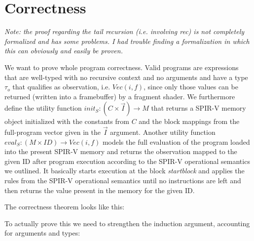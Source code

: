 \documentclass[letterpaper,12pt]{article}
\newcommand{\vi}{\vec{I}}
\begin{document}
\section{Correctness}

\textit{Note: the proof regarding the tail recursion (i.e. involving \textit{rec})
is not completely formalized and has some problems. I had trouble finding a formalization
in which this can obviously and easily be proven.}
\medskip

We want to prove whole program correctness. Valid programs are expressions
that are well-typed with no recursive context and no arguments and
have a type $\tau_o$ that qualifies as observation, i.e. $Vec(i, f)$, since only
those values can be returned (written into a framebuffer) by a fragment shader.
We furthermore define the utility function
$init_S: (C \times \vi) \rightarrow M $ that returns
a SPIR-V memory object initialized with the constants from $C$ and the 
block mappings from the full-program vector given in the $\vi$ argument.
Another utility function $eval_S: (M \times ID) \rightarrow Vec(i, f)$
models the full evaluation of the program loaded into the present SPIR-V
memory and returns the observation mapped to the given ID after
program execution according to the SPIR-V operational semantics we
outlined. It basically starts execution at the block \textit{startblock}
and applies the rules from the SPIR-V operational semantics until
no instructions are left and then returns the value present in the
memory for the given ID.

The correctness theorem looks like this:

\begin{center}
\end{center}
\medskip
To actually prove this we need to strengthen the induction argument,
accounting for arguments and types:
\end{document}
